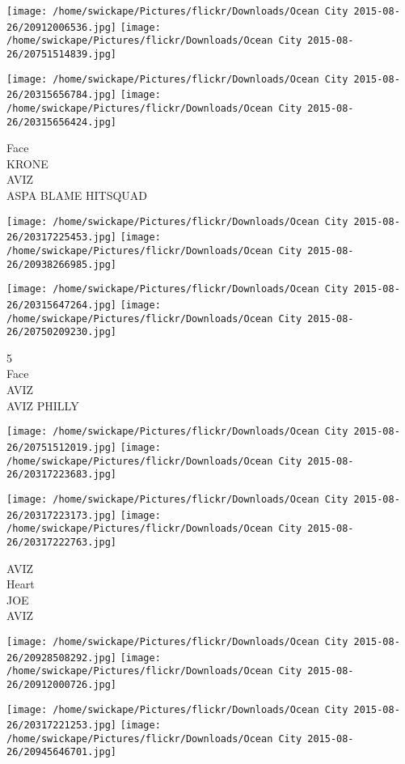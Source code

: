 \documentclass[10pt,letterpaper]{article}
\begin{document}
\texttt{[image: /home/swickape/Pictures/flickr/Downloads/Ocean City 2015-08-26/20912006536.jpg]}
\texttt{[image: /home/swickape/Pictures/flickr/Downloads/Ocean City 2015-08-26/20751514839.jpg]}

\texttt{[image: /home/swickape/Pictures/flickr/Downloads/Ocean City 2015-08-26/20315656784.jpg]}
\texttt{[image: /home/swickape/Pictures/flickr/Downloads/Ocean City 2015-08-26/20315656424.jpg]}

Face\\
KRONE\\
AVIZ\\
ASPA BLAME HITSQUAD
\pagebreak

\texttt{[image: /home/swickape/Pictures/flickr/Downloads/Ocean City 2015-08-26/20317225453.jpg]}
\texttt{[image: /home/swickape/Pictures/flickr/Downloads/Ocean City 2015-08-26/20938266985.jpg]}

\texttt{[image: /home/swickape/Pictures/flickr/Downloads/Ocean City 2015-08-26/20315647264.jpg]}
\texttt{[image: /home/swickape/Pictures/flickr/Downloads/Ocean City 2015-08-26/20750209230.jpg]}

5\\
Face\\
AVIZ\\
AVIZ PHILLY
\pagebreak

\texttt{[image: /home/swickape/Pictures/flickr/Downloads/Ocean City 2015-08-26/20751512019.jpg]}
\texttt{[image: /home/swickape/Pictures/flickr/Downloads/Ocean City 2015-08-26/20317223683.jpg]}

\texttt{[image: /home/swickape/Pictures/flickr/Downloads/Ocean City 2015-08-26/20317223173.jpg]}
\texttt{[image: /home/swickape/Pictures/flickr/Downloads/Ocean City 2015-08-26/20317222763.jpg]}

AVIZ\\
Heart\\
JOE\\
AVIZ
\pagebreak

\texttt{[image: /home/swickape/Pictures/flickr/Downloads/Ocean City 2015-08-26/20928508292.jpg]}
\texttt{[image: /home/swickape/Pictures/flickr/Downloads/Ocean City 2015-08-26/20912000726.jpg]}

\texttt{[image: /home/swickape/Pictures/flickr/Downloads/Ocean City 2015-08-26/20317221253.jpg]}
\texttt{[image: /home/swickape/Pictures/flickr/Downloads/Ocean City 2015-08-26/20945646701.jpg]}
\end{document}
